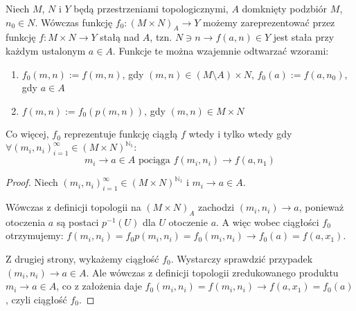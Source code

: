 \begin{prop}
  Niech $M$, $N$ i $Y$ będą przestrzeniami topologicznymi, $A$ domknięty podzbiór $M$, $n_0 \in N$. Wówczas funkcję $f_0: (M \times N)_A \rightarrow Y$ możemy zareprezentować przez funkcję $f: M \times N \rightarrow Y$ stałą nad $A$, tzn. $N \ni n \rightarrow f(a, n) \in Y$ jest stała przy każdym ustalonym $a \in A$. Funkcje te można wzajemnie odtwarzać wzorami:
  \begin{enumerate}
   \item $f_0(m,n) := f(m,n)$, gdy $(m,n) \in (M \setminus A) \times N$, $f_0(a) := f(a, n_0)$, gdy $a \in A$
   \item $f(m,n) := f_0(p(m,n))$, gdy $(m,n) \in M \times N$
  \end{enumerate}

  
  Co więcej, $f_0$ reprezentuje funkcję ciągłą $f$ wtedy i tylko wtedy gdy $\forall (m_i, n_i)_{i=1}^\infty \in (M \times N)^{\mathbb{N}_1}:$
  $$m_i \rightarrow a \in A \mbox{ pociąga } f(m_i, n_i) \rightarrow f(a, n_1)$$
  
  \begin{proof}
    Niech $(m_i, n_i)_{i=1}^\infty \in (M \times N)^{\mathbb{N}_1}$ i $m_i \rightarrow a \in A$.
    
    Wówczas z definicji topologii na $(M \times N)_A$ zachodzi $(m_i, n_i) \rightarrow a$, ponieważ otoczenia $a$ są postaci $p^{-1}(U)$ dla $U$ otoczenie $a$. A więc wobec ciągłości $f_0$ otrzymujemy: $f(m_i, n_i) = f_0 p(m_i, n_i) = f_0(m_i, n_i) \rightarrow f_0(a) = f(a, x_1)$.
    
    Z drugiej strony, wykażemy ciągłość $f_0$. Wystarczy sprawdzić przypadek $(m_i, n_i) \rightarrow a \in A$. Ale wówczas z definicji topologii zredukowanego produktu $m_i \rightarrow a \in A$, co z założenia daje $f_0(m_i, n_i) = f(m_i, n_i) \rightarrow f(a, x_1) = f_0(a)$, czyli ciągłość $f_0$.
  \end{proof}
\end{prop}

